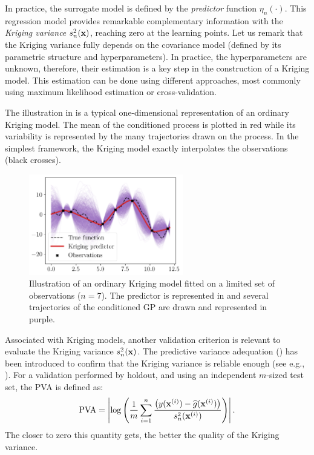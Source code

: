 In practice, the surrogate model is defined by the \textit{predictor} function $\eta_n(\cdot)$. 
This regression model provides remarkable complementary information with the \textit{Kriging variance} $s_n^2({\bf x})$, reaching zero at the learning points. 
Let us remark that the Kriging variance fully depends on the covariance model (defined by its parametric structure and hyperparameters). 
In practice, the hyperparameters are unknown, therefore, their estimation is a key step in the construction of a Kriging model. 
This estimation can be done using different approaches, most commonly using maximum likelihood estimation or cross-validation.

The illustration in  is a typical one-dimensional representation of an ordinary Kriging model. 
The mean of the conditioned process is plotted in red while its variability is represented by the many trajectories drawn on the process. 
In the simplest framework, the Kriging model exactly interpolates the observations (black crosses). 

\begin{figure}[ht]
    \centering
    \includegraphics[width=0.6\textwidth]{../numerical_experiments/chapter1/figures/kriging_1D.png}
    \caption{Illustration of an ordinary Kriging model fitted on a limited set of observations ($n=7$). 
    The predictor is represented in and several trajectories of the conditioned GP are drawn and represented in purple.}
    \label{fig:kriging_1D}
\end{figure}


Associated with Kriging models, another validation criterion is relevant to evaluate the Kriging variance $s_n^2({\bf x})$. 
The predictive variance adequation () has been introduced to confirm that the Kriging variance is reliable enough (see e.g., \citealp{bachoc_2013}). 
For a validation performed by holdout, and using an independent $m$-sized test set, the PVA is defined as: 
\begin{equation}
    \mathrm{PVA} = \left| \log\left( \frac1m \sum_{i=1}^{n} \frac{\left(y({\bf x}^{(i)}) - \widehat{g}({\bf x}^{(i)})\right)}{s_n^2({\bf x}^{(i)})}\right) \right|.
\end{equation}
The closer to zero this quantity gets, the better the quality of the Kriging variance. 


